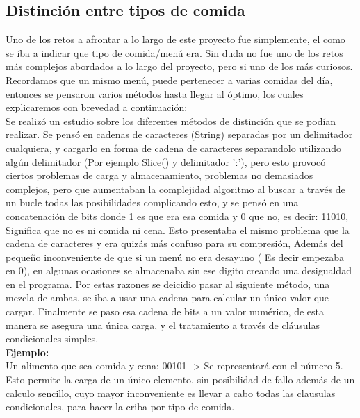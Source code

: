 \subsection{Distinción entre tipos de comida}
Uno de los retos a afrontar a lo largo de este proyecto fue simplemente, el como se iba a indicar que tipo de comida/menú era. Sin duda no fue uno de los retos más complejos abordados a lo largo del proyecto, pero si uno de los más curiosos.\\

Recordamos que un mismo menú, puede pertenecer a varias comidas del día, entonces se pensaron varios métodos hasta llegar al óptimo, los cuales explicaremos con brevedad a continuación:\\

Se realizó un estudio sobre los diferentes métodos de distinción que se podían realizar. Se pensó en  cadenas de caracteres (String) separadas por un delimitador cualquiera, y cargarlo en forma de cadena de caracteres separandolo utilizando algún delimitador (Por ejemplo Slice() y delimitador ':'), pero esto provocó ciertos problemas de carga y almacenamiento, problemas no demasiados complejos, pero que aumentaban la complejidad algoritmo al buscar a través de un bucle todas las posibilidades complicando esto, y se pensó en una concatenación de bits donde 1 es que era esa comida y 0 que no, es decir: 11010, Significa que no es ni comida ni cena. Esto presentaba el mismo problema que la cadena de caracteres y era quizás más confuso para su compresión, Además del pequeño inconveniente de que si un menú no era desayuno ( Es decir empezaba en 0), en algunas ocasiones se almacenaba sin ese digito creando una desigualdad en el programa. Por estas razones se deicidio pasar al siguiente método, una mezcla de ambas, se iba a usar una cadena para calcular un único valor que cargar. Finalmente se paso esa cadena de bits a un valor numérico, de esta manera se asegura una única carga, y el tratamiento a través de cláusulas condicionales simples.\\

\textbf{Ejemplo:}\\
Un alimento que sea comida y cena: 00101 -> Se representará con el número 5. \\
Esto permite la carga de un único elemento, sin posibilidad de fallo además de un calculo sencillo, cuyo mayor inconveniente es llevar a cabo todas las clausulas condicionales, para hacer la criba por tipo de comida.\\

